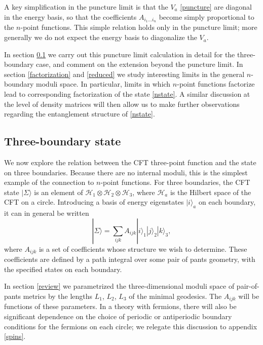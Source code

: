 \documentclass[12pt]{article}
\newcommand{\be}{\begin{equation}}
\newcommand{\ee}{\end{equation}}
\numberwithin{equation}{section}
\begin{document}
A key simplification in the puncture limit is that the $V_a$ \eqref{puncture} are diagonal in the energy basis, so that the coefficients $A_{i_1 \ldots i_n}$ become simply proportional to the $n$-point functions. This simple relation holds only in the puncture limit; more generally we do not expect the energy basis to diagonalize the $V_a$.

In section \ref{3ptf} we carry out this puncture limit calculation in detail for the three-boundary case, and comment on the extension beyond the puncture limit. In section \ref{factorization} and \ref{reduced} we study  interesting limits in the general $n$-boundary moduli space. In particular, limits in which $n$-point functions factorize lead to corresponding factorization of the state \eqref{nstate}. A similar discussion at the level of density matrices will then allow us to make further observations regarding the entanglement structure of \eqref{nstate}.

%
\subsection{Three-boundary state}
\label{3ptf}
%



We now explore the relation between the CFT three-point function and the state on three boundaries. Because there are no internal moduli, this is the simplest example of the connection to $n$-point functions.  For three boundaries, the CFT state $|\Sigma \rangle$  is an element of $\mathcal H_1 \otimes \mathcal H_2 \otimes \mathcal H_3$, where $\mathcal H_a$ is the Hilbert space of the CFT on a circle. Introducing a basis of  energy eigenstates $|i \rangle_a$ on each boundary, it can in general be written
%
\be \label{3state}
|\Sigma \rangle = \sum_{ijk} A_{ijk} |i\rangle_1 |j\rangle_2 |k\rangle_3,
\ee
%
where $A_{ijk}$ is a set of coefficients whose structure we wish to determine. These coefficients are defined by a path integral over some pair of pants geometry, with the specified states on each boundary.

In section \ref{review} we parametrized the three-dimensional moduli space of pair-of-pants metrics by the lengths $L_1$, $L_2$, $L_3$ of the minimal geodesics. The $A_{ijk}$ will be functions of these parameters. In a theory with fermions, there will also be significant dependence on the choice of periodic or antiperiodic boundary conditions for the fermions on each circle; we relegate this discussion to appendix \ref{spins}.
\end{document}
